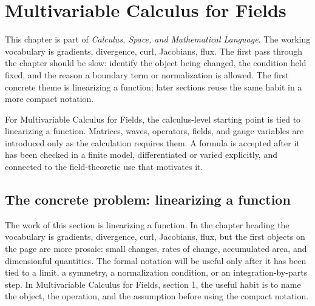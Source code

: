 \chapter{Multivariable Calculus for Fields}


This chapter is part of \emph{Calculus, Space, and Mathematical Language}.  The working vocabulary is gradients, divergence, curl, Jacobians, flux.  The first pass through the chapter should be slow: identify the object being changed, the condition held fixed, and the reason a boundary term or normalization is allowed.  The first concrete theme is linearizing a function; later sections reuse the same habit in a more compact notation.

For Multivariable Calculus for Fields, the calculus-level starting point is tied to linearizing a function.  Matrices, waves, operators, fields, and gauge variables are introduced only as the calculation requires them.  A formula is accepted after it has been checked in a finite model, differentiated or varied explicitly, and connected to the field-theoretic use that motivates it.

\section{The concrete problem: linearizing a function}













The work of this section is linearizing a function.  In the chapter heading the vocabulary is gradients, divergence, curl, Jacobians, flux, but the first objects on the page are more prosaic: small changes, rates of change, accumulated area, and dimensionful quantities.  The formal notation will be useful only after it has been tied to a limit, a symmetry, a normalization condition, or an integration-by-parts step.  In Multivariable Calculus for Fields, section 1, the useful habit is to name the object, the operation, and the assumption before using the compact notation.

